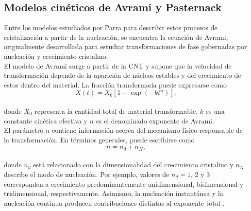 \documentclass[12pt,letterpaper,oneside]{report}
\begin{document}

\subsection{Modelos cinéticos de Avrami y Pasternack}

Entre los modelos estudiados por Parra para describir estos procesos de cristalización a partir de la nucleación, se encuentra la ecuación de Avrami, originalmente desarrollada para estudiar transformaciones de fase gobernadas por nucleación y crecimiento cristalino.\\

El modelo de Avrami surge a partir de la CNT y supone que la velocidad de transformación depende de la aparición de núcleos estables y del crecimiento de estos dentro del material. La fracción transformada puede expresarse como\\

\begin{equation}
X(t)
=
X_0
\left[
1-\exp\left(-kt^{n}\right)
\right],
\label{eq:avrami}
\end{equation}\\

\noindent donde $X_0$ representa la cantidad total de material transformable, $k$ es una constante cinética efectiva y $n$ es el denominado exponente de Avrami.\\

El parámetro $n$ contiene información acerca del mecanismo físico responsable de la transformación. En términos generales, puede escribirse como\\

\begin{equation}
n=n_d+n_N,
\end{equation}\\

\noindent donde $n_d$ está relacionado con la dimensionalidad del crecimiento cristalino y $n_N$ describe el modo de nucleación. Por ejemplo, valores de $n_d=1$, $2$ y $3$ corresponden a crecimiento predominantemente unidimensional, bidimensional y tridimensional, respectivamente. Asimismo, la nucleación instantánea y la nucleación continua producen contribuciones distintas al exponente total \cite{AlirioParra2023}.\\
\end{document}
